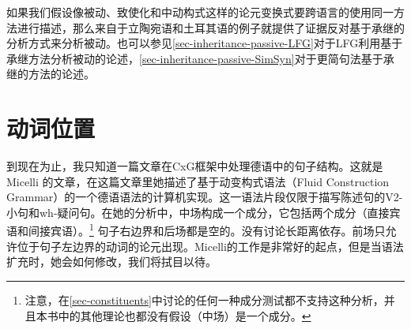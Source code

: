 如果我们假设像被动、致使化和中动构式这样的论元变换式要跨语言的使用同一方法进行描述，那么来自于立陶宛语和土耳其语的例子就提供了证据反对基于承继的分析方式来分析被动\citep{Mueller2006d,Mueller2007d,MWArgSt}。也可以参见\ref{sec-inheritance-passive-LFG}对于LFG利用基于承继方法分析被动的论述，\ref{sec-inheritance-passive-SimSyn}对于更简句法基于承继的方法的论述。

\section{动词位置}

到现在为止，我只知道一篇文章在CxG框架中处理德语中的句子结构。这就是Micelli \citeyearpar{Micelli2012a}的文章，在这篇文章里她描述了基于动变构式语法\indexfcg（Fluid Construction Grammar）的一个德语语法的计算机实现。这一语法片段仅限于描写陈述句的V2-小句和wh-疑问句。在她的分析中，中场构成一个成分，它包括两个成分（直接宾语和间接宾语）。\footnote{%
  注意，在\ref{sec-constituents}中讨论的任何一种成分测试都不支持这种分析，并且本书中的其他理论也都没有假设\mf （中场）是一个成分。%
} 句子右边界和后场都是空的。没有讨论长距离依存。前场只允许位于句子左边界的动词的论元出现。Micelli的工作是非常好的起点，但是当语法扩充时，她会如何修改，我们将拭目以待。

